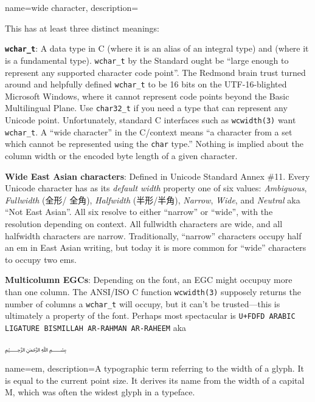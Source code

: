 {
  name={wide character},
  description={This has at least three distinct meanings:
\begin{denseitemize}
\item \textbf{\texttt{wchar\_t}}: A data type in C (where it is an alias of an integral
  type) and \CC (where it is a fundamental type). \texttt{wchar\_t} by the
  Standard ought be ``large enough to represent any supported character code
  point''. The Redmond brain trust turned around and helpfully defined
  \texttt{wchar\_t} to be 16 bits on the UTF-16-blighted Microsoft Windows,
  where it cannot represent code points beyond the Basic Multilingual Plane.
  Use \texttt{char32\_t} if you need a type that can represent any Unicode
  point. Unfortunately, standard C interfaces such as \texttt{wcwidth(3)} want
  \texttt{wchar\_t}. A ``wide character'' in the C/\CC context means ``a character
  from a set which cannot be represented using the \texttt{char} type.'' Nothing is implied
  about the column width or the encoded byte length of a given character.
\item \textbf{Wide East Asian characters}: Defined in Unicode Standard Annex \#11.
    Every Unicode character has as its \textit{default width} property one of
    six values: \textit{Ambiguous}, \textit{Fullwidth} (全形/ 全角),
    \textit{Halfwidth} (半形/半角), \textit{Narrow}, \textit{Wide}, and \textit{Neutral}
    aka ``Not East Asian''. All six resolve to either ``narrow'' or ``wide'', with
    the resolution depending on context. All fullwidth characters are wide, and
    all halfwidth characters are narrow. Traditionally, ``narrow'' characters
    occupy half an \gls{em} in East Asian writing, but today it is more common
    for ``wide'' characters to occupy two ems.
\item \textbf{Multicolumn EGCs}: Depending on the font, an EGC might occupuy
  more than one column. The ANSI/ISO C function \texttt{wcwidth(3)} supposely
  returns the number of columns a \texttt{wchar\_t} will occupy, but it can't
  be trusted---this is ultimately a property of the font. Perhaps most
  spectacular is \texttt{U+FDFD ARABIC LIGATURE BISMILLAH AR-RAHMAN AR-RAHEEM}
  aka \begin{arab}[utf]﷽\end{arab}
\end{denseitemize}}
}

{
  name={em},
  description={A typographic term referring to the width of a glyph. It is
    equal to the current point size. It derives its name from the width of a
    capital M, which was often the widest glyph in a typeface.}
}

